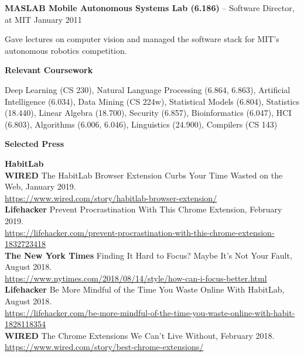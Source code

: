 \documentclass[10pt,A4]{article}
\newcommand{\cvsection}[1]
{
	\begin{center}
		\large\textcolor{sectcol}{\textbf{#1}}
	\end{center}
}
\begin{document}
\textbf{MASLAB Mobile Autonomous Systems Lab (6.186)} -- Software Director, at MIT \hfill \textcolor{sectcol}{January 2011}

Gave lectures on computer vision and managed the software stack for MIT's autonomous robotics competition.\\

\cvsection{Relevant Coursework}

Deep Learning (CS 230), Natural Language Processing (6.864, 6.863), Artificial Intelligence (6.034), Data Mining (CS 224w), Statistical Models (6.804), Statistics (18.440), Linear Algebra (18.700), Security (6.857), Bioinformatics (6.047), HCI (6.803), Algorithms (6.006, 6.046), Linguistics (24.900), Compilers (CS 143)\\

\cvsection{Selected Press}

\textcolor{sectcol}{\textbf{HabitLab}}\\

\textbf{WIRED} The HabitLab Browser Extension Curbs Your Time Wasted on the Web, January 2019.\\
\url{https://www.wired.com/story/habitlab-browser-extension/}\\

\textbf{Lifehacker} Prevent Procrastination With This Chrome Extension, February 2019.\\
\url{https://lifehacker.com/prevent-procrastination-with-this-chrome-extension-1832723418}\\

\textbf{The New York Times} Finding It Hard to Focus? Maybe It’s Not Your Fault, August 2018.\\
\url{https://www.nytimes.com/2018/08/14/style/how-can-i-focus-better.html}\\

\textbf{Lifehacker} Be More Mindful of the Time You Waste Online With HabitLab, August 2018.\\
\url{https://lifehacker.com/be-more-mindful-of-the-time-you-waste-online-with-habit-1828118354}\\

\textbf{WIRED} The Chrome Extensions We Can't Live Without, February 2018.\\
\url{https://www.wired.com/story/best-chrome-extensions/}\\
\end{document}

